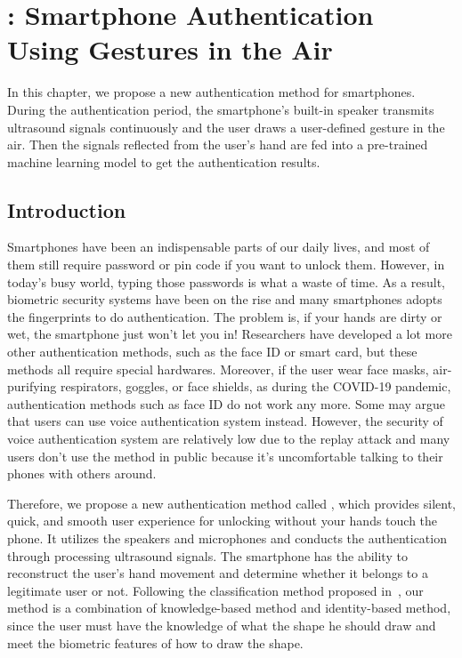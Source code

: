 \chapter{{\uu}: Smartphone Authentication \protect \\
Using Gestures in the Air}

In this chapter, we propose a new authentication method for smartphones. During the authentication period, the smartphone's built-in speaker transmits ultrasound signals continuously and the user draws a user-defined gesture in the air. Then the signals reflected from the user's hand are fed into a pre-trained machine learning model to get the authentication results. 


\section{Introduction}
Smartphones have been an indispensable parts of our daily lives, and most of them still require password or pin code if you want to unlock them. However, in today’s busy world, typing those passwords is what a waste of time. As a result, biometric security systems have been on the rise and many smartphones adopts the fingerprints to do authentication. The problem is, if your hands are dirty or wet, the smartphone just won’t let you in! Researchers have developed a lot more other authentication methods, such as the face ID or smart card, but these methods all require special hardwares. Moreover, if the user wear face masks, air-purifying respirators, goggles, or face shields, as during the COVID-19 pandemic, authentication methods such as face ID do not work any more. Some may argue that users can use voice authentication system instead. However, the security of voice authentication system are relatively low due to the replay attack and many users don't use the method in public because it’s uncomfortable talking to their phones with others around.

Therefore, we propose a new authentication method called {\uu}, which provides silent, quick, and smooth user experience for unlocking without your hands touch the phone. It utilizes the speakers and microphones and conducts the authentication through processing ultrasound signals. The smartphone has the ability to reconstruct the user’s hand movement and determine whether it belongs to a legitimate user or not. Following the classification method proposed in~\cite{vongsingthong2015survey}, our method is a combination of knowledge-based method and identity-based method, since the user must have the knowledge of what the shape he should draw and meet the biometric features of how to draw the shape.

